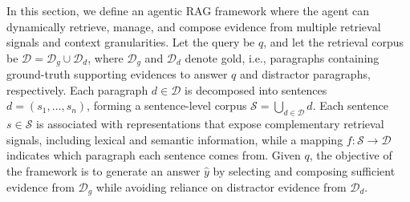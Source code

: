 \documentclass[11pt]{article}
\begin{document}


In this section, we define an agentic RAG framework where the agent can dynamically retrieve, manage, and compose evidence from multiple retrieval signals and context granularities. Let the query be $q$, and let the retrieval corpus be $\mathcal{D}=\mathcal{D}_{g}\cup\mathcal{D}_{d}$, where $\mathcal{D}_{g}$ and $\mathcal{D}_{d}$ denote gold, i.e., paragraphs containing ground-truth supporting evidences to answer $q$ and distractor paragraphs, respectively. Each paragraph $d\in\mathcal{D}$ is decomposed into sentences $d=(s_1,\dots,s_n)$, forming a sentence-level corpus $\mathcal{S}=\bigcup_{d\in\mathcal{D}} d$. Each sentence $s\in\mathcal{S}$ is associated with representations that expose complementary retrieval signals, including lexical and semantic information, while a mapping $f:\mathcal{S}\rightarrow\mathcal{D}$ indicates which paragraph each sentence comes from. Given $q$, the objective of the framework is to generate an answer $\hat{y}$ by selecting and composing sufficient evidence from \(\mathcal{D}_{g}\) while avoiding reliance on distractor evidence from \(\mathcal{D}_{d}\).
%
\end{document}
